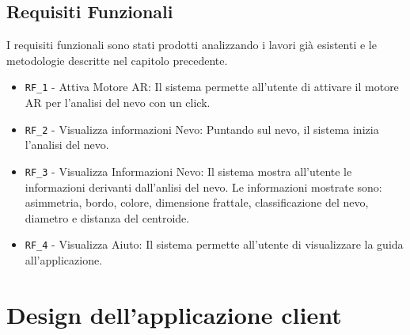 {\subsection{Requisiti Funzionali}
I requisiti funzionali sono stati prodotti analizzando i lavori già esistenti e le metodologie descritte nel capitolo precedente.
\begin{itemize}
	\item \verb|RF_1| - Attiva Motore AR: Il sistema permette all'utente di attivare il motore AR per l'analisi del nevo con un click.
	\item \verb|RF_2| - Visualizza informazioni Nevo: Puntando sul nevo, il sistema inizia l'analisi del nevo.
	\item \verb|RF_3| - Visualizza Informazioni Nevo: Il sistema mostra all'utente le informazioni derivanti dall'anlisi del nevo. Le informazioni mostrate sono: asimmetria, bordo, colore, dimensione frattale, classificazione del nevo, diametro e distanza del centroide.
	\item \verb|RF_4| - Visualizza Aiuto: Il sistema permette all'utente di visualizzare la guida all'applicazione.
\end{itemize}
\newpage
\section{Design dell'applicazione client}
}
